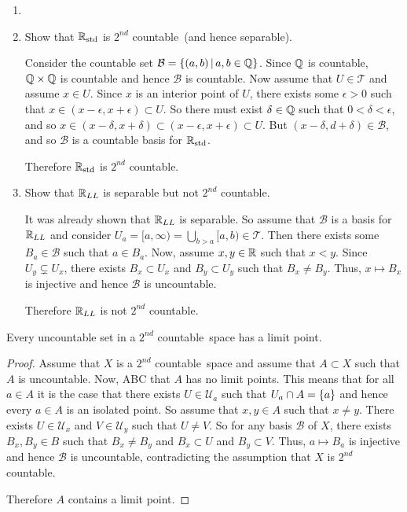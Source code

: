 \documentclass[letterpaper,12pt,fleqn]{article}
\newcommand{\T}{\mathscr{T}}
\newcommand{\B}{\mathcal{B}}
\newcommand{\U}{\mathcal{U}}
\renewcommand{\sc}{\(2^{nd}\) countable}
\newcommand{\Rs}{\R_{\text{std}}}
\newcommand{\RL}{\R_{LL}}
\newcommand{\e}{\epsilon}
\renewcommand{\d}{\delta}
\begin{document}
\begin{example}
  \begin{enumerate}
    \item[]
    \item Show that \(\Rs\) is \sc\ (and hence separable).

      Consider the countable set \(\B=\setb{(a,b)}{a,b\in\Q}\).  Since \(\mathbb{Q}\) is countable, \(\mathbb{Q}\times\mathbb{Q}\) is
      countable and hence \(\B\) is countable.  Now assume that \(U\in\T\) and assume \(x\in U\).  Since \(x\) is
      an interior point of \(U\), there exists some \(\e>0\) such that \(x\in(x-\e,x+\e)\subset U\).  So there must
      exist \(\d\in\Q\) such that \(0<\d<\e\), and so \(x\in(x-\d,x+\d)\subset(x-\e,x+\e)\subset U\).  But
      \((x-\d,d+\d)\in\B\), and so \(\B\) is a countable basis for \(\Rs\).

      Therefore \(\Rs\) is \sc.

    \item Show that \(\RL\) is separable but not \sc.

      It was already shown that \(\RL\) is separable.  So assume that \(\B\) is a basis for \(\RL\) and consider
      \(\displaystyle U_a=[a,\infty)=\bigcup_{b>a}[a,b)\in\T\).  Then there exists some \(B_a\in\B\) such that
      \(a\in B_a\).  Now, assume \(x,y\in\mathbb{R}\) such that \(x<y\).  Since \(U_y\subsetneq U_x\), there exists
      \(B_x\subset U_x\) and \(B_y\subset U_y\) such that \(B_x\ne B_y\).  Thus, \(x\mapsto B_x\) is injective
      and hence \(\B\) is uncountable.

      Therefore \(\RL\) is not \sc.
  \end{enumerate}
\end{example}

\begin{theorem}
  Every uncountable set in a \sc\ space has a limit point.
\end{theorem}

\begin{proof}
  Assume that \(X\) is a \sc\ space and assume that \(A\subset X\) such that \(A\) is uncountable.  Now, ABC that
  \(A\) has no limit points.  This means that for all \(a\in A\) it is the case that there exists \(U\in\U_a\) such
  that \(U_a\cap A=\{a\}\) and hence every \(a\in A\) is an isolated point.  So assume that \(x,y\in A\) such
  that \(x\ne y\).  There exists \(U\in\U_x\) and \(V\in\U_y\) such that \(U\ne V\).  So for any basis \(\B\) of
  \(X\), there exists \(B_x,B_y\in B\) such that \(B_x\ne B_y\) and \(B_x\subset U\) and \(B_y\subset V\).  Thus,
  \(a\mapsto B_a\) is injective and hence \(\B\) is uncountable, contradicting the assumption that \(X\) is \sc.

  Therefore \(A\) contains a limit point.
\end{proof}
\end{document}

